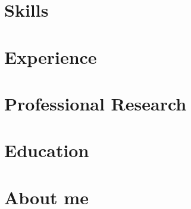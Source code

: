 \documentclass[letter,11pt]{article}
\begin{document}
\section{Skills}


\section{Experience}


\section{Professional Research}


\section{Education}


\section{About me}

\end{document}
